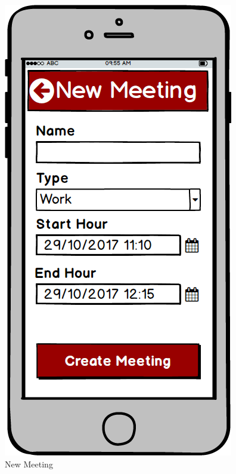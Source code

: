 \begin{figure}[!htb]
\begin{minipage}[b]{0.3\textwidth}
	\includegraphics[scale=0.3]{images/NewMeeting}
	\caption{New Meeting}
	\label{ref:newMeeting}
\end{minipage}
\hfill
\begin{minipage}[b]{0.3\textwidth}
	\centering

\end{minipage}
\end{figure}
